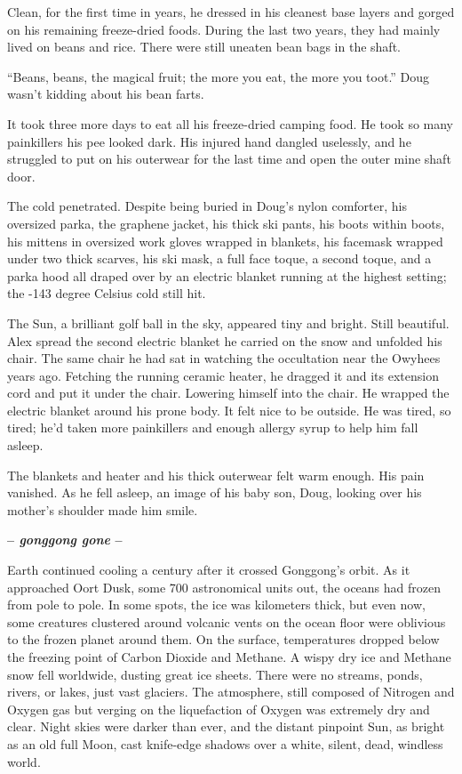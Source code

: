 Clean, for the first time in years, he dressed in his cleanest base
layers and gorged on his remaining freeze-dried foods. During the last
two years, they had mainly lived on beans and rice. There were still
uneaten bean bags in the shaft.

``Beans, beans, the magical fruit; the more you eat, the more you
toot.'' Doug wasn't kidding about his bean farts.

It took three more days to eat all his freeze-dried camping food. He
took so many painkillers his pee looked dark. His injured hand dangled
uselessly, and he struggled to put on his outerwear for the last time
and open the outer mine shaft door.

The cold penetrated. Despite being buried in Doug's nylon comforter, his
oversized parka, the graphene jacket, his thick ski pants, his boots
within boots, his mittens in oversized work gloves wrapped in blankets,
his facemask wrapped under two thick scarves, his ski mask, a full face
toque, a second toque, and a parka hood all draped over by an electric
blanket running at the highest setting; the -143 degree Celsius cold
still hit.

The Sun, a brilliant golf ball in the sky, appeared tiny and bright.
Still beautiful. Alex spread the second electric blanket he carried on
the snow and unfolded his chair. The same chair he had sat in watching
the occultation near the Owyhees years ago. Fetching the running ceramic
heater, he dragged it and its extension cord and put it under the chair.
Lowering himself into the chair. He wrapped the electric blanket around
his prone body. It felt nice to be outside. He was tired, so tired; he'd
taken more painkillers and enough allergy syrup to help him fall asleep.

The blankets and heater and his thick outerwear felt warm enough. His
pain vanished. As he fell asleep, an image of his baby son, Doug,
looking over his mother's shoulder made him smile.

\begin{center}\large\textbf{-- \emph{gonggong gone} --}\normalsize\end{center}

Earth continued cooling a century after it crossed Gonggong's orbit. As
it approached Oort Dusk, some 700 astronomical units out, the oceans had
frozen from pole to pole. In some spots, the ice was kilometers thick,
but even now, some creatures clustered around volcanic vents on the
ocean floor were oblivious to the frozen planet around them. On the
surface, temperatures dropped below the freezing point of Carbon Dioxide
and Methane. A wispy dry ice and Methane snow fell worldwide, dusting
great ice sheets. There were no streams, ponds, rivers, or lakes, just
vast glaciers. The atmosphere, still composed of Nitrogen and Oxygen gas
but verging on the liquefaction of Oxygen was extremely dry and clear.
Night skies were darker than ever, and the distant pinpoint Sun, as
bright as an old full Moon, cast knife-edge shadows over a white,
silent, dead, windless world.

